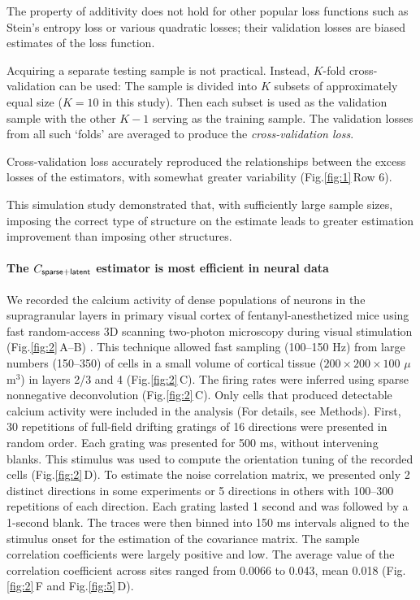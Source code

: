 \documentclass[10pt]{article}
\newcommand{\sq}[1]{\lq#1\rq}
\newcommand{\figref}[2]{Fig.\;\ref{fig:#1}\,#2}
\begin{document}
The property of additivity does not hold for other popular loss functions such as Stein's entropy loss or various quadratic losses; their validation losses are biased estimates of the loss function. 

Acquiring a separate testing sample is not practical. Instead, $K$-fold cross-validation can be used: The sample is divided into $K$ subsets of approximately equal size ($K=10$ in this study).  Then each subset is used as the validation sample with the other $K-1$ serving as the training sample. The validation losses from all such \sq{folds} are averaged to produce the \emph{cross-validation loss}.  

Cross-validation loss accurately reproduced the relationships between the excess losses of the estimators, with somewhat greater variability (\figref{1}{Row 6}). 

This simulation study demonstrated that, with sufficiently large sample sizes, imposing the correct type of structure on the estimate leads to greater estimation improvement than imposing other structures.

\paragraph{The $C_{\sf sparse+latent}$ estimator is most efficient in neural data}
We recorded the calcium activity of dense populations of neurons in the supragranular layers in primary visual cortex of fentanyl-anesthetized mice using fast random-access 3D scanning two-photon microscopy during visual stimulation (\figref{2}{A--B}) \cite{Reddy:2005, Katona:2012, Cotton:2013}. This technique allowed fast sampling (100--150 Hz) from large numbers (150--350) of cells in a small volume of cortical tissue ($200\times200\times100$ $\mu$m$^3$) in layers 2/3 and 4 (\figref{2}{C}).  The firing rates were inferred using sparse nonnegative deconvolution \cite{Vogelstein:2010} (\figref{2}{C}). Only cells that produced detectable calcium activity were included in the analysis (For details, see Methods).  First, 30 repetitions of full-field drifting gratings of 16 directions were presented in random order.  Each grating was presented for 500 ms, without intervening blanks.  This stimulus was used to compute the orientation tuning of the recorded cells (\figref{2}{D}). To estimate the noise correlation matrix, we presented only 2 distinct directions in some experiments or 5 directions in others with 100--300 repetitions of each direction. Each grating lasted 1 second and was followed by a 1-second blank.  The traces were then binned into 150 ms intervals aligned to the stimulus onset for the estimation of the covariance matrix.   The sample correlation coefficients were largely positive and low. The average value of the correlation coefficient across sites ranged from 0.0066 to 0.043, mean 0.018 (\figref{2}{F} and \figref{5}{D}).  
\end{document}
